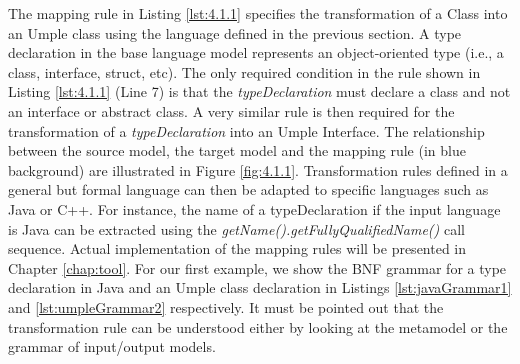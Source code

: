 The mapping rule in Listing \ref{lst:4.1.1} specifies the transformation of a Class into an Umple class using the language defined in the previous section. A type declaration in the base language model represents an object-oriented type (i.e., a class, interface, struct, etc). The only required condition in the rule shown in Listing \ref{lst:4.1.1} (Line 7) is that the \textit{typeDeclaration} must declare a class and not an interface or abstract class. A very similar rule is then required for the transformation of a \textit{typeDeclaration} into an Umple Interface. The relationship between the source model, the target model and the mapping rule (in blue background) are illustrated in Figure \ref{fig:4.1.1}.
Transformation rules defined in a general but formal language can then be adapted to specific languages such as Java or C++. For instance, the name of a typeDeclaration if the input language is Java can be extracted using the \textit{getName().getFullyQualifiedName()} call sequence. Actual implementation of the mapping rules will be presented in Chapter \ref{chap:tool}. For our first example, we show the BNF grammar for a type declaration in Java and an Umple class declaration in Listings \ref{lst:javaGrammar1} and \ref{lst:umpleGrammar2} respectively. It must be pointed out that the transformation rule can be understood either by looking at the metamodel or the grammar of input/output models. 




